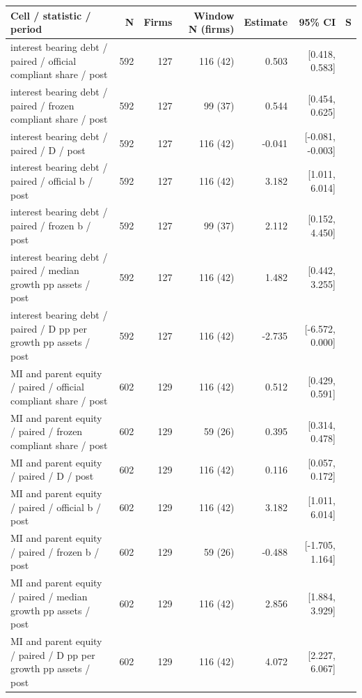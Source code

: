 \begin{threeparttable}
\begin{tabular}{p{5.7cm}rrrrrl}
\toprule
Cell / statistic / period & N & Firms & Window N (firms) & Estimate & 95\% CI & S \\
\midrule
interest bearing debt / paired / official compliant share / post & 592 & 127 & 116 (42) & 0.503 & [0.418, 0.583] &  \\
interest bearing debt / paired / frozen compliant share / post & 592 & 127 & 99 (37) & 0.544 & [0.454, 0.625] &  \\
interest bearing debt / paired / D / post & 592 & 127 & 116 (42) & -0.041 & [-0.081, -0.003] &  \\
interest bearing debt / paired / official b / post & 592 & 127 & 116 (42) & 3.182 & [1.011, 6.014] &  \\
interest bearing debt / paired / frozen b / post & 592 & 127 & 99 (37) & 2.112 & [0.152, 4.450] &  \\
interest bearing debt / paired / median growth pp assets / post & 592 & 127 & 116 (42) & 1.482 & [0.442, 3.255] &  \\
interest bearing debt / paired / D pp per growth pp assets / post & 592 & 127 & 116 (42) & -2.735 & [-6.572, 0.000] &  \\
MI and parent equity / paired / official compliant share / post & 602 & 129 & 116 (42) & 0.512 & [0.429, 0.591] &  \\
MI and parent equity / paired / frozen compliant share / post & 602 & 129 & 59 (26) & 0.395 & [0.314, 0.478] &  \\
MI and parent equity / paired / D / post & 602 & 129 & 116 (42) & 0.116 & [0.057, 0.172] &  \\
MI and parent equity / paired / official b / post & 602 & 129 & 116 (42) & 3.182 & [1.011, 6.014] &  \\
MI and parent equity / paired / frozen b / post & 602 & 129 & 59 (26) & -0.488 & [-1.705, 1.164] &  \\
MI and parent equity / paired / median growth pp assets / post & 602 & 129 & 116 (42) & 2.856 & [1.884, 3.929] &  \\
MI and parent equity / paired / D pp per growth pp assets / post & 602 & 129 & 116 (42) & 4.072 & [2.227, 6.067] &  \\
\bottomrule
\end{tabular}
\begin{tablenotes}[flushleft]\footnotesize

\end{tablenotes}
\end{threeparttable}
